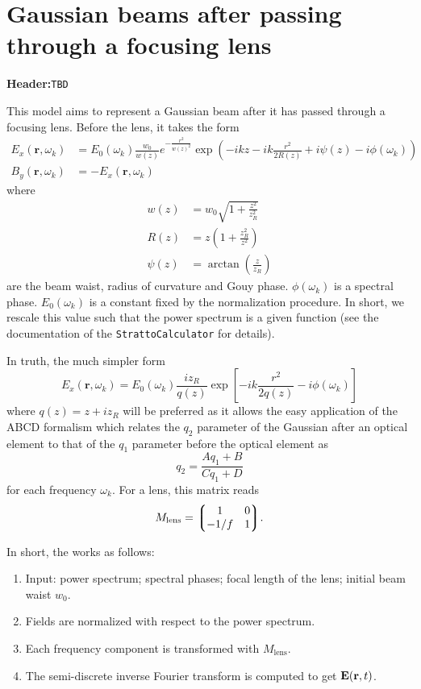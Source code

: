 \documentclass[10pt,letterpaper,extrafontsizes, onecolumn,openright]{memoir}
\newcommand{\bo}[1]{\ensuremath{\boldsymbol{#1}}}
\begin{document}
\section{Gaussian beams after passing through a focusing lens}
\textbf{Header:}\hfill\texttt{TBD}
\vspace{0.5cm}

This model aims to represent a Gaussian beam after it has passed
through a focusing lens. Before the lens, it takes the form
	\begin{align}
		E_x(\bo{r},\omega_k) &=  E_0(\omega_k)\frac{w_0}{w(z)}e^{-\frac{r^2}{w(z)^2}}\exp\left(-ikz-ik\frac{r^2}{2R(z)}+i\psi(z)-i\phi(\omega_k)\right) \\
		B_y(\bo{r},\omega_k) &= -E_x(\bo{r},\omega_k)
	\end{align}
where
	\begin{align}
		w(z)    &= w_0\sqrt{1+\frac{z^2}{z_R^2}} \\
		R(z)    &= z\left(1+\frac{z_R^2}{z^2}\right) \\
		\psi(z) &= \arctan\left(\frac{z}{z_R}\right)
	\end{align}
are the beam waist, radius of curvature and Gouy phase. $\phi(\omega_k)$
is a spectral phase.
$E_0(\omega_k)$ is a constant fixed by the normalization procedure. In short,
we rescale this value such that the power spectrum is a given function (see the
documentation of the \texttt{StrattoCalculator} for details).

In truth, the much simpler form
	\begin{equation}
		E_x(\bo{r},\omega_k) = E_0(\omega_k)\frac{iz_R}{q(z)}\exp\left[-ik\frac{r^2}{2q(z)}-i\phi(\omega_k)\right]
	\end{equation}
where $q(z) = z + i z_R$ will be preferred as it allows the easy application of the ABCD formalism which
relates the $q_2$ parameter of the Gaussian after an optical element to that
of the $q_1$ parameter before the optical element as
	\begin{equation}
		q_2 = \frac{Aq_1+B}{Cq_1+D}
	\end{equation}
for each frequency $\omega_k$. For a lens, this matrix reads
	\begin{equation}
		M_\text{lens} = \mqty*(1 & 0 \\ -1/f & 1).
	\end{equation}

In short, the works as follows:
	\begin{enumerate}
			\item Input: power spectrum; spectral phases; focal length of the lens; initial beam waist $w_0$.
			\item Fields are normalized with respect to the power spectrum.
			\item Each frequency component is transformed with $M_\text{lens}$.
			\item The semi-discrete inverse Fourier transform is computed to get $\vb{E}(\vb{r},t)$.
	\end{enumerate}


\appendix



\end{document}
